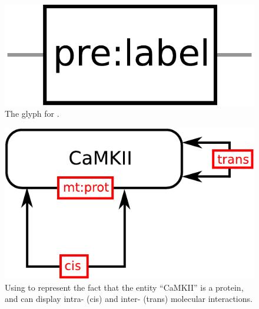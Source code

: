 \begin{figure}[H]
  \centering
  \includegraphics[scale = 0.3]{images/unitInformation}
  \caption{The \ER glyph for .}
  \label{fig:unitInformation}
\end{figure}


\begin{figure}[H]
  \centering
  \includegraphics[scale = 0.5]{examples/ex-unitInformation}
  \caption{Using  to represent the fact that the entity ``CaMKII'' is a protein, and can display intra- (cis) and inter- (trans) molecular interactions.}
  \label{fig:ex-unitInformation}
\end{figure}

\normalcolor
